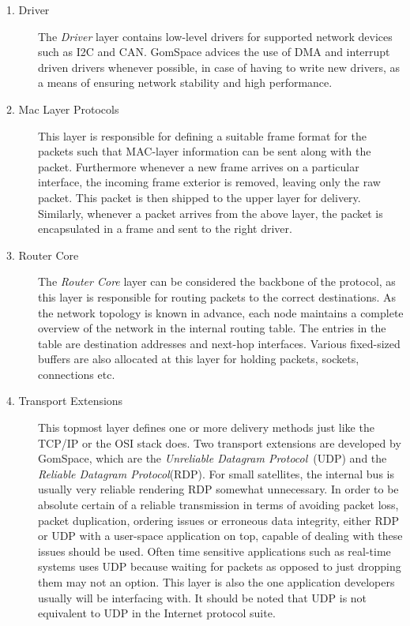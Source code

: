 \begin{description}
	\item[1. Driver] The \textit{Driver} layer contains low-level drivers for supported network devices such as I2C and CAN. GomSpace advices the use of DMA and interrupt driven drivers whenever possible, in case of having to write new drivers, as a means of ensuring network stability and high performance.
	\item[2. Mac Layer Protocols] This layer is responsible for defining a suitable frame format for the packets such that MAC-layer information can be sent along with the packet. Furthermore whenever a new frame arrives on a particular interface, the incoming frame exterior is removed, leaving only the raw packet. This packet is then shipped to the upper layer for delivery. Similarly, whenever a packet arrives from the above layer, the packet is encapsulated in a frame and sent to the right driver.
	\item[3. Router Core] The \textit{Router Core} layer can be considered the backbone of the protocol, as this layer is responsible for routing packets to the correct destinations. As the network topology is known in advance, each node maintains a complete overview of the network in the internal routing table. The entries in the table are destination addresses and next-hop interfaces. Various fixed-sized buffers are also allocated at this layer for holding packets, sockets, connections etc.
	\item[4. Transport Extensions] This topmost layer defines one or more delivery methods just like the TCP/IP or the OSI stack does. Two transport extensions are developed by GomSpace, which are the \textit{Unreliable Datagram Protocol}~(UDP) and the \textit{Reliable Datagram Protocol}(RDP). For small satellites, the internal bus is usually very reliable rendering RDP somewhat unnecessary. In order to be absolute certain of a reliable transmission in terms of avoiding packet loss, packet duplication, ordering issues or erroneous data integrity, either RDP or UDP with a user-space application on top, capable of dealing with these issues should be used. Often time sensitive applications such as real-time systems uses UDP because waiting for packets as opposed to just dropping them may not an option. This layer is also the one application developers usually will be interfacing with. It should be noted that UDP is not equivalent to UDP in the Internet protocol suite.

\end{description}
  
